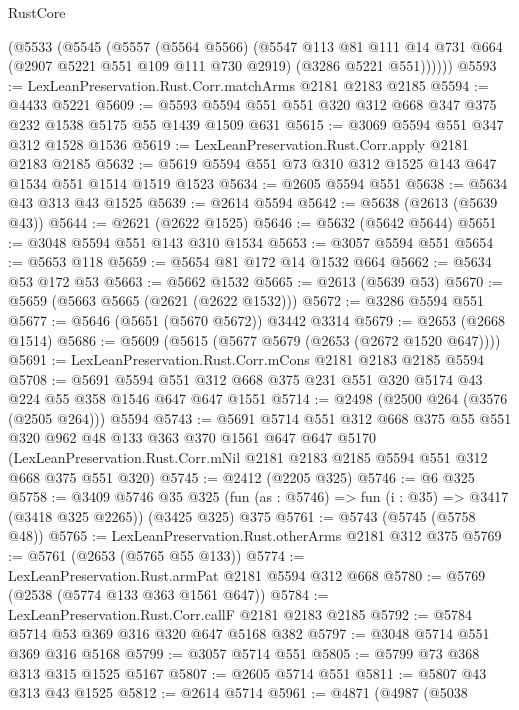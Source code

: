 \begin{lexlean}{RustCore}
\begin{coremodule}
      (@5533
        (@5545
          (@5557
            (@5564 @5566)
            (@5547
              @113
              @81
              @111
              @14
              @731
              @664
              (@2907 @5221 @551 @109 @111 @730 @2919)
              (@3286 @5221 @551))))))
@5593 := LexLeanPreservation.Rust.Corr.matchArms @2181 @2183 @2185
@5594 := @4433 @5221
@5609 := @5593 @5594 @551 @551 @320 @312 @668 @347 @375 @232 @1538 @5175 @55 @1439 @1509 @631
@5615 := @3069 @5594 @551 @347 @312 @1528 @1536
@5619 := LexLeanPreservation.Rust.Corr.apply @2181 @2183 @2185
@5632 := @5619 @5594 @551 @73 @310 @312 @1525 @143 @647 @1534 @551 @1514 @1519 @1523
@5634 := @2605 @5594 @551
@5638 := @5634 @43 @313 @43 @1525
@5639 := @2614 @5594
@5642 := @5638 (@2613 (@5639 @43))
@5644 := @2621 (@2622 @1525)
@5646 := @5632 (@5642 @5644)
@5651 := @3048 @5594 @551 @143 @310 @1534
@5653 := @3057 @5594 @551
@5654 := @5653 @118
@5659 := @5654 @81 @172 @14 @1532 @664
@5662 := @5634 @53 @172 @53
@5663 := @5662 @1532
@5665 := @2613 (@5639 @53)
@5670 := @5659 (@5663 @5665 (@2621 (@2622 @1532)))
@5672 := @3286 @5594 @551
@5677 := @5646 (@5651 (@5670 @5672)) @3442 @3314
@5679 := @2653 (@2668 @1514)
@5686 := @5609 (@5615 (@5677 @5679 (@2653 (@2672 @1520 @647))))
@5691 := LexLeanPreservation.Rust.Corr.mCons @2181 @2183 @2185 @5594
@5708 := @5691
    @5594
    @551
    @312
    @668
    @375
    @231
    @551
    @320
    @5174
    @43
    @224
    @55
    @358
    @1546
    @647
    @647
    @1551
@5714 := @2498 (@2500 @264 (@3576 (@2505 @264))) @5594
@5743 := @5691
    @5714
    @551
    @312
    @668
    @375
    @55
    @551
    @320
    @962
    @48
    @133
    @363
    @370
    @1561
    @647
    @647
    @5170
    (LexLeanPreservation.Rust.Corr.mNil @2181 @2183 @2185 @5594 @551 @312 @668 @375 @551 @320)
@5745 := @2412 (@2205 @325)
@5746 := @6 @325
@5758 := @3409
    @5746
    @35
    @325
    (fun (as : @5746) => fun (i : @35) => @3417 (@3418 @325 @2265))
    (@3425 @325)
    @375
@5761 := @5743 (@5745 (@5758 @48))
@5765 := LexLeanPreservation.Rust.otherArms @2181 @312 @375
@5769 := @5761 (@2653 (@5765 @55 @133))
@5774 := LexLeanPreservation.Rust.armPat @2181 @5594 @312 @668
@5780 := @5769 (@2538 (@5774 @133 @363 @1561 @647))
@5784 := LexLeanPreservation.Rust.Corr.callF @2181 @2183 @2185
@5792 := @5784 @5714 @53 @369 @316 @320 @647 @5168 @382
@5797 := @3048 @5714 @551 @369 @316 @5168
@5799 := @3057 @5714 @551
@5805 := @5799 @73 @368 @313 @315 @1525 @5167
@5807 := @2605 @5714 @551
@5811 := @5807 @43 @313 @43 @1525
@5812 := @2614 @5714
@5961 := @4871
    (@4987
      (@5038

\end{coremodule}
\end{lexlean}
